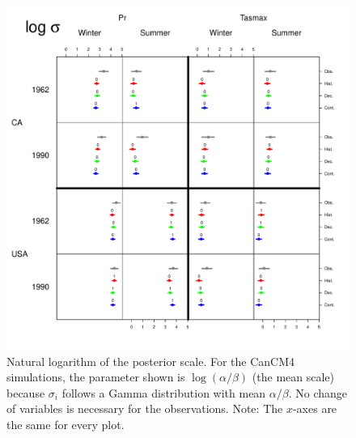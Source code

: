\begin{figure}
\begin{center}
 \includegraphics[scale=0.72]{figs/log_sigma.pdf}
\end{center}
\caption{Natural logarithm of the posterior scale. For the CanCM4 simulations, the parameter shown is $\log (\alpha/\beta)$ (the mean scale) because $\sigma_i$ follows a Gamma distribution with mean $\alpha/\beta$. No change of variables is necessary for the observations. Note: The $x$-axes are the same for every plot.}
\label{sigma}
\end{figure}

